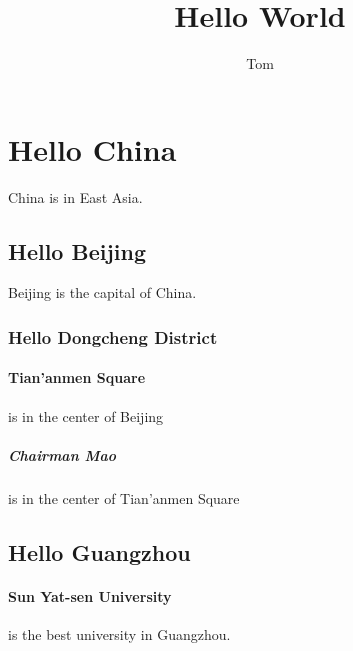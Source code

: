 \documentclass{article}
\title{Hello World}
\author{Tom}
\begin{document}
  \maketitle
  \section{Hello China} China is in East Asia.
  \subsection{Hello Beijing} Beijing is the capital of China.
  \subsubsection{Hello Dongcheng District}
  \paragraph{Tian'anmen Square}is in the center of Beijing
  \subparagraph{Chairman Mao} is in the center of Tian'anmen Square
  \subsection{Hello Guangzhou}
  \paragraph{Sun Yat-sen University} is the best university in Guangzhou.
\end{document}
